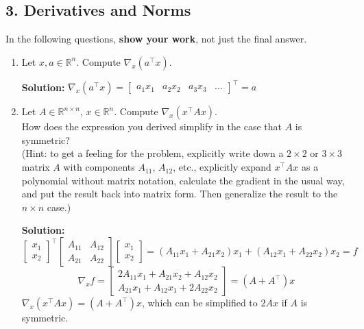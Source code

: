 \documentclass{article}
\newcommand{\solution}{\textbf{Solution: }}
\newcommand{\R}{\mathbb{R}}
\begin{document}
\newpage
\subsection*{3. Derivatives and Norms}
In the following questions, \textbf{show your work}, not just the final answer. 
\begin{enumerate}[label=(\alph*)]
    \item Let $x, a \in \R^n$. Compute $\nabla_x(a^{\top}x)$.
    \begin{mdframed} \solution
    $\nabla_x(a^{\top}x)=\begin{bmatrix}a_1x_1 & a_2x_2 & a_3x_3 & \dots \end{bmatrix}^{\top}=a$
    \end{mdframed}
    
    \item Let $A \in \R^{n\times n}$, $x \in \R^n$. Compute $\nabla_x(x^{\top} Ax)$. \\ How does the expression you derived simplify in the case that $A$ is symmetric? \\
    
    (Hint: to get a feeling for the problem, explicitly write down a $2 \times 2$ or $3 \times 3$ matrix $A$ with components $A_{11}$, $A_{12}$, etc., explicitly expand $x^{\top}Ax$ as a polynomial without matrix notation, calculate the gradient in the usual way, and put the result back into matrix form. Then generalize the result to the $n \times n$ case.)
    \begin{mdframed} \solution
    \[
    \begin{bmatrix}
    x_{1}\\
    x_{2}
    \end{bmatrix}^{\top}
    \begin{bmatrix}
    A_{11} & A_{12}\\
    A_{21} & A_{22}
    \end{bmatrix}
    \begin{bmatrix}
    x_{1} \\
    x_{2}
    \end{bmatrix}
    =(A_{11}x_1+A_{21}x_2)x_1 + (A_{12}x_1+A_{22}x_2)x_2=f
    \]
    \[
    \nabla_xf=
    \begin{bmatrix}
    2A_{11}x_1+A_{21}x_2+A_{12}x_2 \\
    A_{21}x_1+A_{12}x_1+2A_{22}x_2
    \end{bmatrix}
    =(A+A^{\top})x
    \]
    $\nabla_x(x^{\top}Ax)=(A+A^{\top})x$, which can be simplified to $2Ax$ if $A$ is symmetric.
    \end{mdframed}
    

\end{enumerate}
\end{document}
